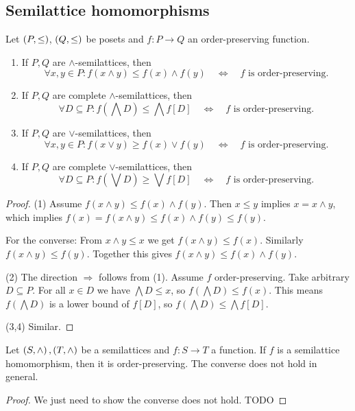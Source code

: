 \subsection{Semilattice homomorphisms}
\begin{proposition} \label{orderPreservingFunctionLatticeOperations}
Let $\left( P,\leq \right)$, $\left( Q,\leq \right)$ be posets and $f: P\to Q$ an order-preserving function.
\begin{enumerate}
\item If $P,Q$ are $\wedge$-semilattices, then
\[  \forall x,y\in P: f(x\wedge y) \leq f(x)\wedge f(y) \quad\iff\quad \text{$f$ is order-preserving}. \]
\item If $P,Q$ are complete $\wedge$-semilattices, then
\[  \forall D\subseteq P: f(\bigwedge D) \leq \bigwedge f[D] \quad\iff\quad \text{$f$ is order-preserving}. \]
\item If $P,Q$ are $\vee$-semilattices, then
\[  \forall x,y\in P: f(x\vee y) \geq f(x)\vee f(y) \quad\iff\quad \text{$f$ is order-preserving}. \]
\item If $P,Q$ are complete $\vee$-semilattices, then
\[  \forall D\subseteq P: f(\bigvee D) \geq \bigvee f[D] \quad\iff\quad \text{$f$ is order-preserving}. \]
\end{enumerate} 
\end{proposition}
\begin{proof}
(1) Assume $f(x\wedge y) \leq f(x)\wedge f(y)$. Then $x\leq y$ implies $x = x\wedge y$, which implies $f(x) = f(x\wedge y) \leq f(x)\wedge f(y) \leq f(y)$.

For the converse: From $x\wedge y \leq x$ we get $f(x\wedge y) \leq f(x)$. Similarly $f(x\wedge y) \leq f(y)$. Together this gives $f(x\wedge y) \leq f(x)\wedge f(y)$.

(2) The direction $\Rightarrow$ follows from (1). Assume $f$ order-preserving. Take arbitrary $D\subseteq P$. For all $x\in D$ we have $\bigwedge D \leq x$, so $f(\bigwedge D) \leq f(x)$. This means $f(\bigwedge D)$ is a lower bound of $f[D]$, so $f(\bigwedge D) \leq \bigwedge f[D]$.

(3,4) Similar.
\end{proof}
\begin{corollary}
Let $\left( S,\wedge \right), \left( T, \wedge \right)$ be a semilattices and $f: S\to T$ a function. If $f$ is a semilattice homomorphism, then it is order-preserving. The converse does not hold in general.
\end{corollary}
\begin{proof}
We just need to show the converse does not hold. TODO
\end{proof}

